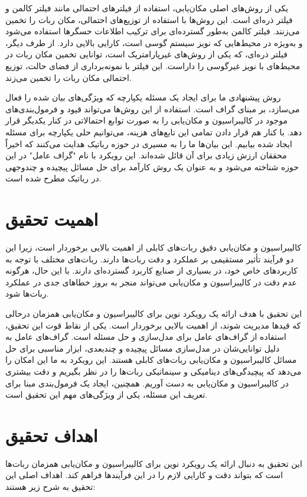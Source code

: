 یکی از روش‌های اصلی مکان‌یابی، استفاده از فیلترهای احتمالی مانند فیلتر کالمن و فیلتر ذره‌ای است. این روش‌ها با استفاده از توزیع‌های احتمالی، مکان ربات را تخمین می‌زنند. فیلتر کالمن به‌طور گسترده‌ای برای ترکیب اطلاعات حسگرها استفاده می‌شود و به‌ویژه در محیط‌هایی که نویز سیستم گوسی است، کارایی بالایی دارد. از طرف دیگر، فیلتر ذره‌ای، که یکی از روش‌های غیرپارامتریک است، توانایی تخمین مکان ربات در محیط‌های با نویز غیرگوسی را داراست. این فیلتر با نمونه‌برداری از فضای حالت، توزیع احتمالی مکان ربات را تخمین می‌زند.

روش پیشنهادی ما برای ایجاد یک مسئله یکپارچه که ویژگی‌های بیان شده را فعال می‌سازد، بر مبنای گراف است. استفاده از این روش‌ها می‌تواند قیود و فرمول‌بندی‌های موجود در کالیبراسیون و مکان‌یابی را به صورت توابع احتمالاتی در کنار یکدیگر قرار دهد. با کنار هم قرار دادن تمامی این تابع‌های هزینه، می‌توانیم حلی یکپارچه برای مسئله ایجاد شده بیابیم. این بیان‌ها ما را به مسیری در حوزه رباتیک هدایت می‌کنند که اخیراً محققان ارزش زیادی برای آن قائل شده‌اند. این رویکرد با نام "گراف عامل" در این حوزه شناخته می‌شود و به عنوان یک روش کارآمد برای حل مسائل پیچیده و چندوجهی در رباتیک مطرح شده است.

\section{اهمیت تحقیق}

کالیبراسیون و مکان‌یابی دقیق ربات‌های کابلی از اهمیت بالایی برخوردار است، زیرا این دو فرآیند تأثیر مستقیمی بر عملکرد و دقت ربات‌ها دارند. ربات‌های مختلف با توجه به کاربردهای خاص خود، در بسیاری از صنایع کاربرد گسترده‌ای دارند. با این حال، هرگونه عدم دقت در کالیبراسیون و مکان‌یابی می‌تواند منجر به بروز خطاهای جدی در عملکرد ربات‌ها شود.

این تحقیق با هدف ارائه یک رویکرد نوین برای کالیبراسیون و مکان‌یابی همزمان درحالی که قیدها مدیریت شوند، از اهمیت بالایی برخوردار است. یکی از نقاط قوت این تحقیق، استفاده از گراف‌های عامل برای مدل‌سازی و حل مسئله است. گراف‌های عامل به دلیل توانایی‌شان در مدل‌سازی مسائل پیچیده و چندبعدی، ابزار مناسبی برای حل مسائل کالیبراسیون و مکان‌یابی ربات‌های کابلی هستند. این رویکرد به ما این امکان را می‌دهد که پیچیدگی‌های دینامیکی و سینماتیکی ربات‌ها را در نظر بگیریم و دقت بیشتری در کالیبراسیون و مکان‌یابی به دست آوریم. همچنین، ایجاد یک فرمول‌بندی مبنا برای تعریف این مسئله، یکی از ویژگی‌های مهم این تحقیق است. 


\section{اهداف تحقیق}
این تحقیق به دنبال ارائه یک رویکرد نوین برای کالیبراسیون و مکان‌یابی همزمان ربات‌ها است که بتواند دقت و کارایی لازم را در این فرآیندها فراهم کند. اهداف اصلی این تحقیق به شرح زیر هستند:

